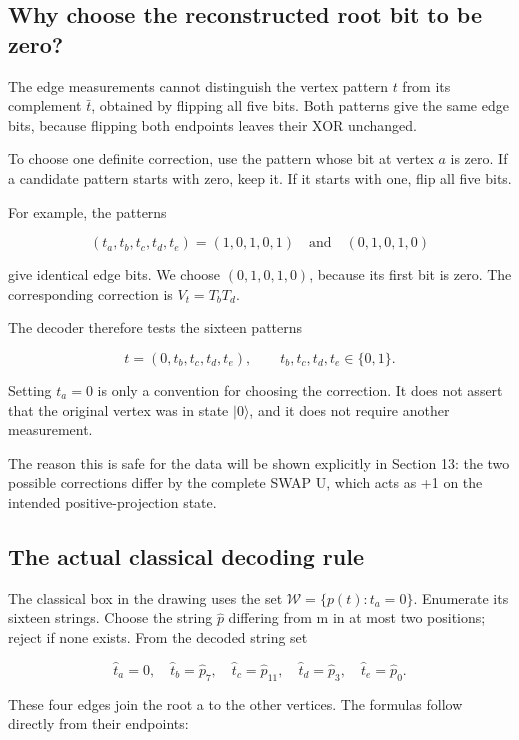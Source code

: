\documentclass[11pt]{article}
\begin{document}
\subsection{Why choose the reconstructed root bit to be zero?}
The edge measurements cannot distinguish the vertex pattern \(t\) from its complement \(\bar t\), obtained by flipping all five bits. Both patterns give the same edge bits, because flipping both endpoints leaves their XOR unchanged.

To choose one definite correction, use the pattern whose bit at vertex \(a\) is zero. If a candidate pattern starts with zero, keep it. If it starts with one, flip all five bits.

For example, the patterns

\[
(t_a,t_b,t_c,t_d,t_e)=(1,0,1,0,1)
\quad\text{and}\quad
(0,1,0,1,0)
\]

give identical edge bits. We choose \((0,1,0,1,0)\), because its first bit is zero. The corresponding correction is \(V_t=T_bT_d\).

The decoder therefore tests the sixteen patterns

\[
t=(0,t_b,t_c,t_d,t_e),
\qquad t_b,t_c,t_d,t_e\in\{0,1\}.
\]

Setting \(t_a=0\) is only a convention for choosing the correction. It does not assert that the original vertex was in state \(|0\rangle\), and it does not require another measurement.

The reason this is safe for the data will be shown explicitly in Section 13: the two possible corrections differ by the complete SWAP U, which acts as +1 on the intended positive-projection state.

\subsection{The actual classical decoding rule}
The classical box in the drawing uses the set \(\mathcal W=\{p(t):t_a=0\}\). Enumerate its sixteen strings. Choose the string \(\widehat p\) differing from m in at most two positions; reject if none exists. From the decoded string set

\[
\widehat t_a=0,\quad \widehat t_b=\widehat p_7,\quad
\widehat t_c=\widehat p_{11},\quad
\widehat t_d=\widehat p_3,\quad \widehat t_e=\widehat p_0.
\]

These four edges join the root a to the other vertices. The formulas follow directly from their endpoints:
\end{document}
